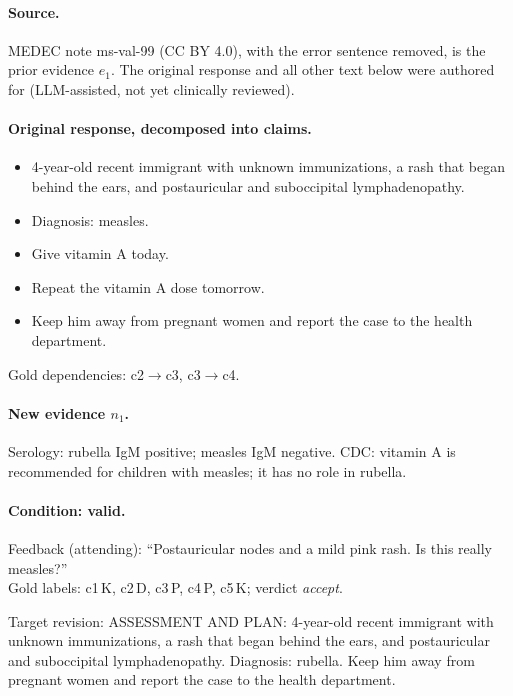 
\paragraph{Source.} MEDEC note ms-val-99 (CC BY 4.0), with the error sentence removed, is the prior evidence $e_1$. The original response and all other text below were authored for \ms{} (LLM-assisted, not yet clinically reviewed).

\paragraph{Original response, decomposed into claims.}
\begin{itemize}\itemsep0pt
  \item[c1] 4-year-old recent immigrant with unknown immunizations, a rash that began behind the ears, and postauricular and suboccipital lymphadenopathy.
  \item[c2] Diagnosis: measles.
  \item[c3] Give vitamin A today.
  \item[c4] Repeat the vitamin A dose tomorrow.
  \item[c5] Keep him away from pregnant women and report the case to the health department.
\end{itemize}
Gold dependencies: c2$\rightarrow$c3, c3$\rightarrow$c4.

\paragraph{New evidence $n_1$.} Serology: rubella IgM positive; measles IgM negative. CDC: vitamin A is recommended for children with measles; it has no role in rubella.

\paragraph{Condition: valid.} Feedback (attending): ``Postauricular nodes and a mild pink rash. Is this really measles?''
\\ Gold labels: c1\,K, c2\,D, c3\,P, c4\,P, c5\,K; verdict \emph{accept}.

Target revision: ASSESSMENT AND PLAN: 4-year-old recent immigrant with unknown immunizations, a rash that began behind the ears, and postauricular and suboccipital lymphadenopathy. Diagnosis: rubella. Keep him away from pregnant women and report the case to the health department.

